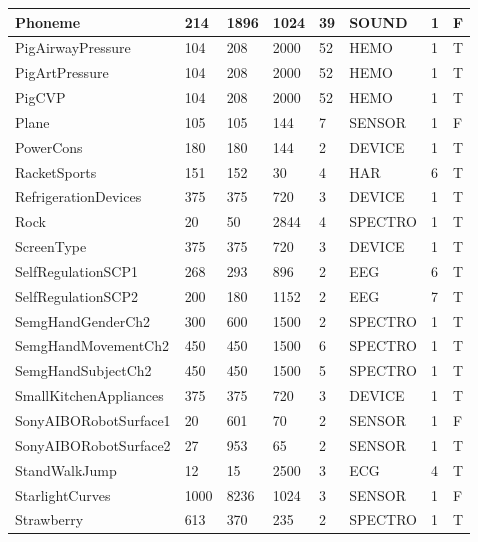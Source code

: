 \begin{landscape}
\begin{longtable}{|*{8}l|}
        \hline
        Phoneme & 214 & 1896 & 1024 & 39 & SOUND & 1 & F \\[1ex]
        \hline
        PigAirwayPressure & 104 & 208 & 2000 & 52 & HEMO & 1 & T \\[1ex]
        \hline
        PigArtPressure & 104 & 208 & 2000 & 52 & HEMO & 1 & T \\[1ex]
        \hline
        PigCVP & 104 & 208 & 2000 & 52 & HEMO & 1 & T \\[1ex]
        \hline
        Plane & 105 & 105 & 144 & 7 & SENSOR & 1 & F \\[1ex]
        \hline
        PowerCons & 180 & 180 & 144 & 2 & DEVICE & 1 & T \\[1ex]
        \hline
        RacketSports & 151 & 152 & 30 & 4 & HAR & 6 & T \\[1ex]
        \hline
        RefrigerationDevices & 375 & 375 & 720 & 3 & DEVICE & 1 & T \\[1ex]
        \hline
        Rock & 20 & 50 & 2844 & 4 & SPECTRO & 1 & T \\[1ex]
        \hline
        ScreenType & 375 & 375 & 720 & 3 & DEVICE & 1 & T \\[1ex]
        \hline
        SelfRegulationSCP1 & 268 & 293 & 896 & 2 & EEG & 6 & T \\[1ex]
        \hline
        SelfRegulationSCP2 & 200 & 180 & 1152 & 2 & EEG & 7 & T \\[1ex]
        \hline
        SemgHandGenderCh2 & 300 & 600 & 1500 & 2 & SPECTRO & 1 & T \\[1ex]
        \hline
        SemgHandMovementCh2 & 450 & 450 & 1500 & 6 & SPECTRO & 1 & T \\[1ex]
        \hline
        SemgHandSubjectCh2 & 450 & 450 & 1500 & 5 & SPECTRO & 1 & T \\[1ex]
        \hline
        SmallKitchenAppliances & 375 & 375 & 720 & 3 & DEVICE & 1 & T \\[1ex]
        \hline
        SonyAIBORobotSurface1 & 20 & 601 & 70 & 2 & SENSOR & 1 & F \\[1ex]
        \hline
        SonyAIBORobotSurface2 & 27 & 953 & 65 & 2 & SENSOR & 1 & T \\[1ex]
        \hline
        StandWalkJump & 12 & 15 & 2500 & 3 & ECG & 4 & T \\[1ex]
        \hline
        StarlightCurves & 1000 & 8236 & 1024 & 3 & SENSOR & 1 & F \\[1ex]
        \hline
        Strawberry & 613 & 370 & 235 & 2 & SPECTRO & 1 & T \\[1ex]

\end{longtable}
\end{landscape}
